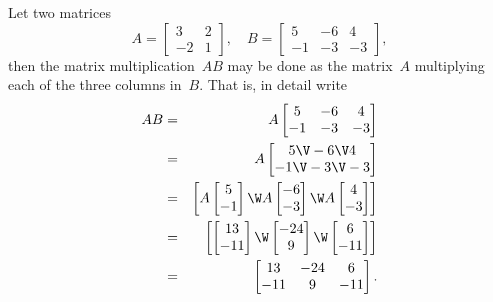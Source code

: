 \begin{example} \label{eg:}
Let two matrices
\begin{equation*}
A=\begin{bmatrix} 3 & 2\\ -2 & 1 \end{bmatrix},\quad
B=\begin{bmatrix} 5 & -6 & 4\\ -1 & -3 & -3 \end{bmatrix},
\end{equation*}
then the matrix multiplication~\(AB\) may be done as the matrix~\(A\) multiplying each of the three columns in~\(B\).
That is, in detail write
\begin{eqnarray*}
AB&=&A\begin{bmatrix} 5 & -6 & 4\\ -1 & -3 & -3 \end{bmatrix}
\\&=&A\begin{bmatrix} 5 \V -6 \V 4\\ -1 \V -3 \V -3 \end{bmatrix}
\\&=&\begin{bmatrix} A\begin{bmatrix} 5\\-1 \end{bmatrix} \W
A\begin{bmatrix} -6\\-3 \end{bmatrix} \W
A\begin{bmatrix} 4\\-3 \end{bmatrix} \end{bmatrix}
\\&=&\begin{bmatrix} \begin{bmatrix} 13\\-11 \end{bmatrix} \W
\begin{bmatrix} -24\\9 \end{bmatrix} \W
\begin{bmatrix}6\\-11 \end{bmatrix} \end{bmatrix}
\\&=&\begin{bmatrix}  13& -24&6\\-11 &9&-11\end{bmatrix}.

\end{eqnarray*}
\end{example}
